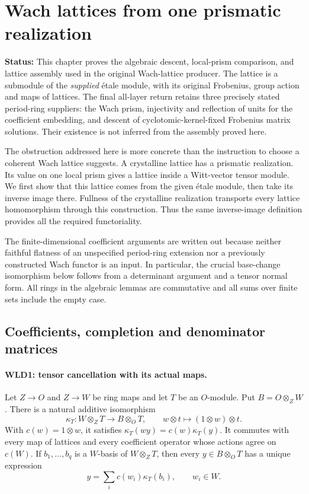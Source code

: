 \documentclass[11pt,a4paper]{article}
\numberwithin{equation}{section}
\theoremstyle{remark}\newtheorem{remark}[theorem]{Remark}
\newcommand{\status}[1]{\textbf{Status:} #1}
\begin{document}
\section{Wach lattices from one prismatic realization}
\label{sec:wach-lattice-descent-v053}

\status{This chapter proves the algebraic descent, local-prism comparison,
and lattice assembly used in the original Wach-lattice producer. The
lattice is a submodule of the \emph{supplied} \'etale module, with its
original Frobenius, group action and maps of lattices. The final all-layer
return retains three precisely stated period-ring suppliers: the Wach
prism, injectivity and reflection of units for the coefficient embedding,
and descent of cyclotomic-kernel-fixed Frobenius matrix solutions.
Their existence is not inferred from the assembly proved here.}

The obstruction addressed here is more concrete than the instruction to
choose a coherent Wach lattice suggests. A crystalline lattice has
a prismatic realization. Its value on one local prism gives a lattice
inside a Witt-vector tensor module. We first show that this lattice
comes from the given \'etale module, then take its inverse image there.
Fullness of the crystalline realization transports every lattice
homomorphism through this construction. Thus the same inverse-image
definition provides all the required functoriality.

The finite-dimensional coefficient arguments are written out because
neither faithful flatness of an unspecified period-ring extension nor
a previously constructed Wach functor is an input. In particular,
the crucial base-change isomorphism below follows from a determinant
argument and a tensor normal form. All rings in the algebraic lemmas
are commutative and all sums over finite sets include the empty case.

\subsection{Coefficients, completion and denominator matrices}

\paragraph{WLD1: tensor cancellation with its actual maps.}
\label{claim:WLD1}
Let $Z\to O$ and $Z\to W$ be ring maps and let $T$ be an $O$-module.
Put $B=O\otimes_ZW$. There is a natural additive isomorphism
\[
 \kappa_T:W\otimes_ZT\longrightarrow B\otimes_OT,\qquad
 w\otimes t\longmapsto(1\otimes w)\otimes t.                 \tag{WLD.1}
\]
With $c(w)=1\otimes w$, it satisfies
$\kappa_T(wy)=c(w)\kappa_T(y)$. It commutes with every map of
lattices and every coefficient operator whose actions agree on
$c(W)$. If $b_1,\ldots,b_q$ is a $W$-basis of $W\otimes_ZT$,
then every $y\in B\otimes_OT$ has a unique expression
\[
                 y=\sum_i c(w_i)\kappa_T(b_i),\qquad w_i\in W.
                                                               \tag{WLD.2}
\]
\end{document}
